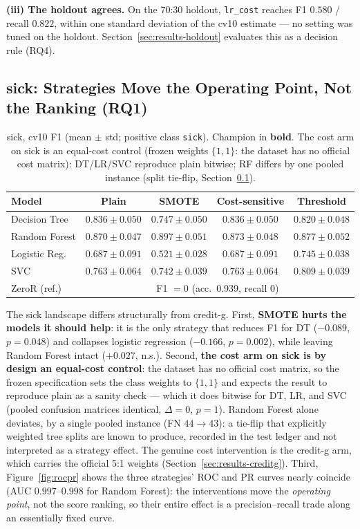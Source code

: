 \textbf{(iii) The holdout agrees.} On the 70:30 holdout, \texttt{lr\_cost} reaches F1 $0.580$ / recall $0.822$, within one standard deviation of the cv10 estimate --- no setting was tuned on the holdout. Section~\ref{sec:results-holdout} evaluates this as a decision rule (RQ4).

\subsection{sick: Strategies Move the Operating Point, Not the Ranking (RQ1)}
\label{sec:results-sick}

\begin{table}[H]
\centering
\caption{sick, cv10 F1 (mean $\pm$ std; positive class \texttt{sick}). Champion in \textbf{bold}. The cost arm on sick is an equal-cost control (frozen weights $\{1,1\}$: the dataset has no official cost matrix): DT/LR/SVC reproduce plain bitwise; RF differs by one pooled instance (split tie-flip, Section~\ref{sec:results-sick}).}
\label{tab:sick-f1}
\begin{tabular}{lcccc}
\toprule
Model & Plain & SMOTE & Cost-sensitive & Threshold \\
\midrule
Decision Tree & $0.836\pm0.050$ & $0.747\pm0.050$ & $0.836\pm0.050$ & $0.820\pm0.048$ \\
Random Forest & $0.870\pm0.047$ & $\mathbf{0.897\pm0.051}$ & $0.873\pm0.048$ & $0.877\pm0.052$ \\
Logistic Reg. & $0.687\pm0.091$ & $0.521\pm0.028$ & $0.687\pm0.091$ & $0.745\pm0.038$ \\
SVC & $0.763\pm0.064$ & $0.742\pm0.039$ & $0.763\pm0.064$ & $0.809\pm0.039$ \\
\midrule
ZeroR (ref.) & \multicolumn{4}{c}{F1 $=0$ (acc.\ 0.939, recall 0)} \\
\bottomrule
\end{tabular}
\end{table}

The sick landscape differs structurally from credit-g. First, \textbf{SMOTE hurts the models it should help}: it is the only strategy that reduces F1 for DT ($-0.089$, $p=0.048$) and collapses logistic regression ($-0.166$, $p=0.002$), while leaving Random Forest intact ($+0.027$, n.s.). Second, \textbf{the cost arm on sick is by design an equal-cost control}: the dataset has no official cost matrix, so the frozen specification sets the class weights to $\{1,1\}$ and expects the result to reproduce plain as a sanity check --- which it does bitwise for DT, LR, and SVC (pooled confusion matrices identical, $\Delta=0$, $p=1$). Random Forest alone deviates, by a single pooled instance (FN $44\to43$): a tie-flip that explicitly weighted tree splits are known to produce, recorded in the test ledger and not interpreted as a strategy effect. The genuine cost intervention is the credit-g arm, which carries the official 5:1 weights (Section~\ref{sec:results-creditg}). Third, Figure~\ref{fig:rocpr} shows the three strategies' ROC and PR curves nearly coincide (AUC $0.997$--$0.998$ for Random Forest): the interventions move the \emph{operating point}, not the score ranking, so their entire effect is a precision--recall trade along an essentially fixed curve.

